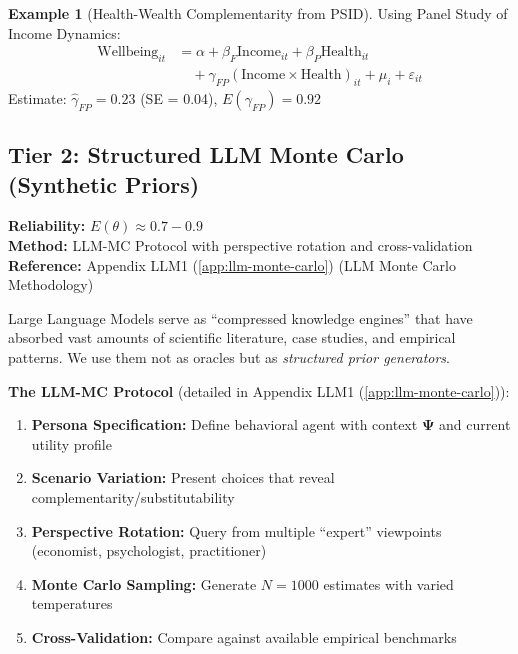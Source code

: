 \documentclass[11pt,a4paper]{article}
\theoremstyle{definition}
\newtheorem{example}{Example}[section]
\begin{document}
\begin{example}[Health-Wealth Complementarity from PSID]
Using Panel Study of Income Dynamics:
\begin{align}
\text{Wellbeing}_{it} &= \alpha + \beta_F \text{Income}_{it} + \beta_P \text{Health}_{it} \nonumber \\
&\quad + \gamma_{FP} (\text{Income} \times \text{Health})_{it} + \mu_i + \varepsilon_{it}
\end{align}
Estimate: $\hat{\gamma}_{FP} = 0.23$ (SE = 0.04), $E(\gamma_{FP}) = 0.92$
\end{example}

\subsection{Tier 2: Structured LLM Monte Carlo (Synthetic Priors)}

\begin{tcolorbox}[colback=yellow!5!white, colframe=yellow!75!black]
\textbf{Reliability:} $E(\theta) \approx 0.7 - 0.9$ \\
\textbf{Method:} LLM-MC Protocol with perspective rotation and cross-validation \\
\textbf{Reference:} Appendix LLM1 (\ref{app:llm-monte-carlo}) (LLM Monte Carlo Methodology)
\end{tcolorbox}

Large Language Models serve as ``compressed knowledge engines'' that have 
absorbed vast amounts of scientific literature, case studies, and empirical 
patterns. We use them not as oracles but as \textit{structured prior generators}.

\textbf{The LLM-MC Protocol} (detailed in Appendix LLM1 (\ref{app:llm-monte-carlo})):
\begin{enumerate}
    \item \textbf{Persona Specification:} Define behavioral agent with context 
    $\boldsymbol{\Psi}$ and current utility profile
    \item \textbf{Scenario Variation:} Present choices that reveal 
    complementarity/substitutability
    \item \textbf{Perspective Rotation:} Query from multiple ``expert'' viewpoints 
    (economist, psychologist, practitioner)
    \item \textbf{Monte Carlo Sampling:} Generate $N = 1000$ estimates with 
    varied temperatures
    \item \textbf{Cross-Validation:} Compare against available empirical benchmarks
\end{enumerate}
\end{document}
